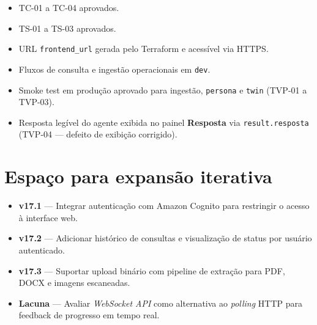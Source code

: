 \begin{itemize}[leftmargin=*]
  \item TC-01 a TC-04 aprovados.
  \item TS-01 a TS-03 aprovados.
  \item URL \texttt{frontend\_url} gerada pelo Terraform e acess\'ivel via HTTPS.
  \item Fluxos de consulta e ingest\~ao operacionais em \texttt{dev}.
  \item Smoke test em produ\c{c}\~ao aprovado para ingest\~ao,
        \texttt{persona} e \texttt{twin} (TVP-01 a TVP-03).
  \item Resposta leg\'ivel do agente exibida no painel \textbf{Resposta}
        via \texttt{result.resposta} (TVP-04 --- defei\-to de exibi\c{c}\~ao corrigido).
\end{itemize}

\section{Espa\c{c}o para expans\~ao iterativa}

\begin{itemize}[leftmargin=*]
  \item \textbf{v17.1} --- Integrar autentica\c{c}\~ao com Amazon Cognito
         para restringir o acesso \`a interface web.
  \item \textbf{v17.2} --- Adicionar hist\'orico de consultas e visualiza\c{c}\~ao
        de status por usu\'ario autenticado.
  \item \textbf{v17.3} --- Suportar upload bin\'ario com pipeline de extra\c{c}\~ao
        para PDF, DOCX e imagens escaneadas.
  \item \textbf{Lacuna} --- Avaliar \textit{WebSocket API} como alternativa
        ao \textit{polling} HTTP para feedback de progresso em tempo real.
\end{itemize}
